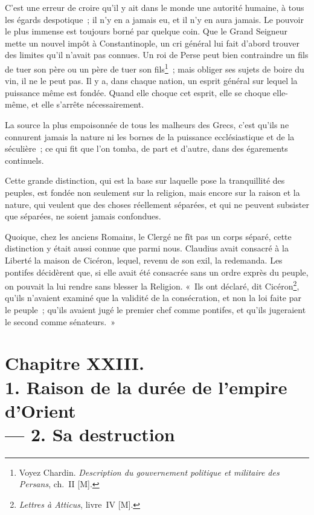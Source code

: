 \documentclass[french,twoside]{book} %
\newcommand\chapteropen{} %
\newcommand\chapterclose{} %
\begin{document}
C’est une erreur de croire qu’il y ait dans le monde une autorité humaine, à tous les égards despotique ; il n’y en a jamais eu, et il n’y en aura jamais. Le pouvoir le plus immense est toujours borné par quelque coin. Que le Grand Seigneur mette un nouvel impôt à Constantinople, un cri général lui fait d’abord trouver des limites qu’il n’avait pas connues. Un roi de Perse peut bien contraindre un fils de tuer son père ou un père de tuer son fils\footnote{Voyez Chardin. {\itshape Description du gouvernement politique et militaire des Persans}, ch. II [M].} ; mais obliger ses sujets de boire du vin, il ne le peut pas. Il y a, dans chaque nation, un esprit général sur lequel la puissance même est fondée. Quand elle choque cet esprit, elle se choque elle-même, et elle s’arrête nécessairement.\par
La source la plus empoisonnée de tous les malheurs des Grecs, c’est qu’ils ne connurent jamais la nature ni les bornes de la puissance ecclésiastique et de la séculière ; ce qui fit que l’on tomba, de part et d’autre, dans des égarements continuels.\par
Cette grande distinction, qui est la base sur laquelle pose la tranquillité des peuples, est fondée non seulement sur la religion, mais encore sur la raison et la nature, qui veulent que des choses réellement séparées, et qui ne peuvent subsister que séparées, ne soient jamais confondues.\par
Quoique, chez les anciens Romains, le Clergé ne fît pas un corps séparé, cette distinction y était aussi connue que parmi nous. Claudius avait consacré à la Liberté la maison de Cicéron, lequel, revenu de son exil, la redemanda. Les pontifes décidèrent que, si elle avait été consacrée sans un ordre exprès du peuple, on pouvait la lui rendre sans blesser la Religion. « Ils ont déclaré, dit Cicéron\footnote{{\itshape Lettres à Atticus}, livre IV [M].}, qu’ils n’avaient examiné que la validité de la consécration, et non la loi faite par le peuple ; qu’ils avaient jugé le premier chef comme pontifes, et qu’ils jugeraient le second comme sénateurs. »
\chapterclose


\chapteropen
\chapter[{Chapitre XXIII. 1. Raison de la durée de l’empire d’Orient, — 2. Sa destruction}]{Chapitre XXIII. \\
1. Raison de la durée de l’empire d’Orient \\
 — 2. Sa destruction}
\label{considérations\_Romains\_chap\_23}\renewcommand{\leftmark}{Chapitre XXIII. \\
1. Raison de la durée de l’empire d’Orient \\
 — 2. Sa destruction}
\end{document}
